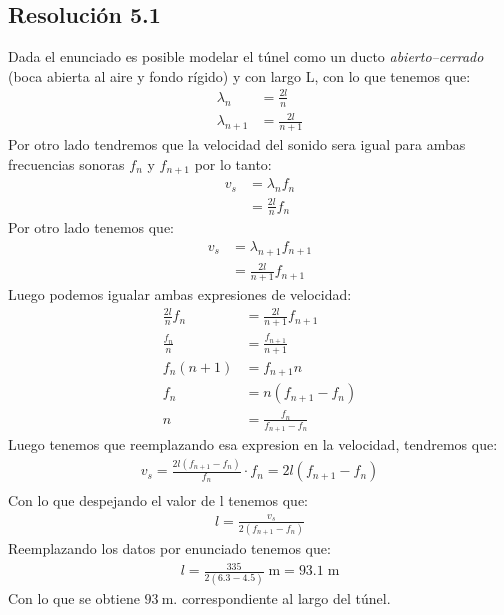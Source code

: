 \documentclass[
  11pt,
  letterpaper,
   addpoints,
   answers
  ]{exam}
\begin{document}
\begin{questions}
\begin{solution}
\subsection*{Resolución 5.1}
Dada el enunciado es posible modelar el túnel como un ducto \textit{abierto–cerrado} (boca abierta al aire y fondo rígido) y con largo L, con lo que tenemos que:
\begin{align}
  \lambda_{n}&= \frac{2l}{n}\\
  \lambda_{n+1} &= \frac{2l}{n+1}
\end{align}
Por otro lado tendremos que la velocidad del sonido sera igual para ambas frecuencias sonoras $f_n$ y $f_{n+1}$ por lo tanto:
\begin{align}
  v_{s} &= \lambda_{n}f_{n}\\
        &= \frac{2l}{n}f_{n}
\end{align}
Por otro lado tenemos que:
\begin{align}
  v_{s}&= \lambda_{n+1}f_{n+1}\\
       &= \frac{2l}{n+1}f_{n+1}
\end{align}
Luego podemos igualar ambas expresiones de velocidad:
\begin{align}
  \frac{2l}{n}f_{n} &= \frac{2l}{n+1}f_{n+1}\\
  \frac{f_{n}}{n} &= \frac{f_{n+1}}{n+1}\\
  f_{n}(n+1) &= f_{n+1}n\\
  f_{n} &= n(f_{n+1}-f_{n})\\
  n&= \frac{f_n}{f_{n+1}-f_n}
\end{align}
Luego tenemos que reemplazando esa expresion en la velocidad, tendremos que:
\begin{align}
  v_s = \frac{2l(f_{n+1}-f_n)}{f_n} \cdot f_n = 2l(f_{n+1}-f_n)\\
\end{align}
Con lo que despejando el valor de l tenemos que:
\begin{align}
  l= \frac{v_{s}}{2(f_{n+1}-f_n)}
\end{align}
Reemplazando los datos por enunciado tenemos que:
\begin{align}
  l= \frac{335}{2(6.3-4.5)}\;\text{m} = 93.1\;\text{m}
\end{align}
Con lo que se obtiene \(\boxed{93~\text{m}}\). correspondiente al largo del túnel.
\end{solution}
\end{questions}
\end{document}
